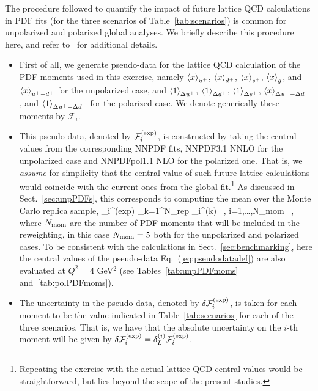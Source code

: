 The procedure followed to quantify the impact of future
lattice QCD calculations
in PDF fits  (for the three scenarios of Table~\ref{tab:scenarios})
is common for unpolarized
and polarized global analyses.
%
We briefly describe this procedure here,
and refer to~\cite{Ball:2011gg,Ball:2010gb} for
additional details.
\begin{itemize}
\item First of all, we generate pseudo-data for the lattice QCD calculation
  of the PDF moments used in this exercise, namely $\left\langle x\right\rangle_{u^+}$,
$\left\langle x\right\rangle_{d^+}$,
$\left\langle x\right\rangle_{s^+}$,
$\left\langle x\right\rangle_{g}$, and
  $\left\langle x\right\rangle_{u^+-d^+}$ for the unpolarized case, and
  $\left\langle 1\right\rangle_{\Delta u^+}$,
$\left\langle 1\right\rangle_{\Delta d^+}$,
$\left\langle 1\right\rangle_{\Delta s^+}$,
$\left\langle x\right\rangle_{\Delta u^--\Delta d^-}$, and
  $\left\langle 1\right\rangle_{\Delta u^+ - \Delta d^+}$ for the polarized case.
  We denote generically these moments by $\mathcal{F}_i$.
\item This pseudo-data, denoted by $\mathcal{F}_i^{\rm (exp)}$,
  is constructed by taking the central values from
  the corresponding NNPDF fits, NNPDF3.1 NNLO for the unpolarized case and NNPDFpol1.1 NLO
  for the polarized one.
  That is, we {\it assume} for simplicity that the central value
  of such future lattice calculations would coincide with the current ones
  from the global fit.\footnote{Repeating the exercise with the actual lattice QCD
    central values would be straightforward, but
    lies beyond the scope of the present studies.}
  As discussed in Sect.~\ref{sec:unpPDFs}, this corresponds to computing
  the mean over the Monte Carlo replica sample,
  \be
  \label{eq:pseudodatadef}
  _i^{\rm (exp)} \equiv {}\sum_{k=1}^{N_{\rm rep}}
  _i^{\rm (k)} \, , \quad i=1,\ldots,N_{\rm mom} \, ,
  \ee
  where $N_{\rm mom}$ are the number of PDF moments that will be included
  in the reweighting, in this case $N_{\rm mom}=5$ both for the unpolarized
  and polarized cases.
  To be consistent with the calculations in Sect.~\ref{sec:benchmarking},
  here the central values of the pseudo-data Eq.~(\ref{eq:pseudodatadef})
  are also evaluated at $Q^2=4$ GeV$^2$ (see Tables~\ref{tab:unpPDFmoms} and~\ref{tab:polPDFmoms}).
\item The uncertainty in the pseudo data, denoted by $\delta\mathcal{F}_i^{\rm (exp)} $,
  is taken for each moment to be the value indicated in
  Table~\ref{tab:scenarios} for each of the three scenarios.%
  That is, we have that the absolute uncertainty on the $i$-th moment
  will be given by $\delta\mathcal{F}_i^{\rm (exp)}=\delta_L^{(i)}\mathcal{F}_i^{\rm (exp)} $.

\end{itemize}
